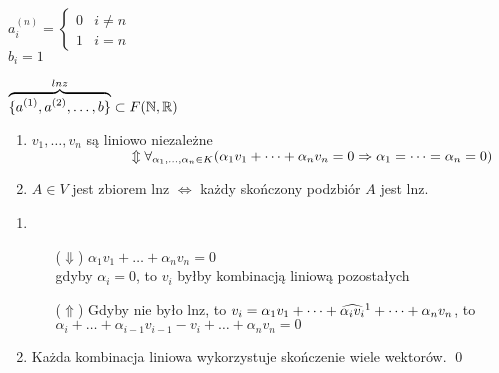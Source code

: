 \begin{prz}
    ~\\
    \begin{minipage}[t]{0.5\textwidth}
    $
    a^{(n)}_i = \begin{cases}
                0 & i \neq n \\
                1 & i = n
              \end{cases}
    $ \\
    $b_i = 1$
    \end{minipage}%
    \begin{minipage}[t]{0.5\textwidth}
       $\overbrace{\{a^{(1)},a^{(2)},\dots,b\}}^{lnz} \subset F(\mathbb{N},\mathbb{R})$

    \end{minipage}
\end{prz}

\begin{ft} \hfill
    \begin{enumerate}[{(}1{)}]
         \item $v_1,\dots,v_n$ są liniowo niezależne \\
        $ \hspace*{25mm} \Updownarrow
        \\
        \forall _{\alpha_1,\dots,\alpha_n\in K} (\alpha_1v_1+\dots+\alpha_nv_n = 0 \Rightarrow \alpha_1 = \dots = \alpha_n =0)$
        \item $A \in V $ jest zbiorem lnz $\iff$ każdy skończony podzbiór $A$ jest lnz.
    \end{enumerate}
\end{ft}
\begin{dd} \hfill
    \begin{enumerate}[{(}1{)}]
        \item \begin{itemize}
            \item[($\Downarrow$)] $\alpha_1v_1 + \dots + \alpha_nv_n = 0$ \\
                gdyby $\alpha_i = 0 $, to $v_i$ byłby kombinacją liniową pozostałych \lightning
            \item[($\Uparrow$)] Gdyby nie było lnz, to $v_i = \alpha_1v_1+\dots+ \widehat{\alpha_i v_i} \text{\footnotemark} +\dots + \alpha_nv_n$, to \\ $\alpha_i + \dots + \alpha_{i-1}v_{i-1} - v_i + \dots + \alpha_nv_n = 0 $ \lightning
        \end{itemize}
        \item Każda kombinacja liniowa wykorzystuje skończenie wiele wektorów. \qed
    \end{enumerate}
\end{dd}


